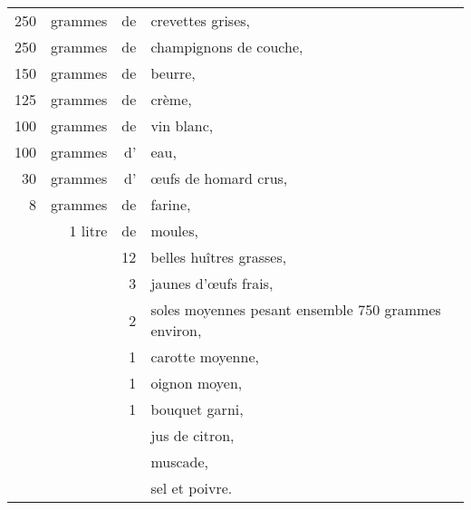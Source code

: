 \footnotesize
\begin{longtable}{rrrp{16em}}
    250 & grammes & de & crevettes grises,                                                                \\
    250 & grammes & de & champignons de couche,                                                           \\
    150 & grammes & de & beurre,                                                                          \\
    125 & grammes & de & crème,                                                                           \\
    100 & grammes & de & vin blanc,                                                                       \\
    100 & grammes & d' & eau,                                                                             \\
     30 & grammes & d' & œufs de homard crus,                                                             \\
      8 & grammes & de & farine,                                                                          \\
        & 1 litre & de & moules,                                                                          \\
        &         & 12 & belles huîtres grasses,                                                          \\
        &         &  3 & jaunes d'œufs frais,                                                             \\
        &         &  2 & soles moyennes pesant ensemble 750 grammes environ,                              \\
        &         &  1 & carotte moyenne,                                                                 \\
        &         &  1 & oignon moyen,                                                                    \\
        &         &  1 & bouquet garni,                                                                   \\
        &         &    & jus de citron,                                                                   \\
        &         &    & muscade,                                                                         \\
        &         &    & sel et poivre.                                                                   \\
\end{longtable}
\normalsize

